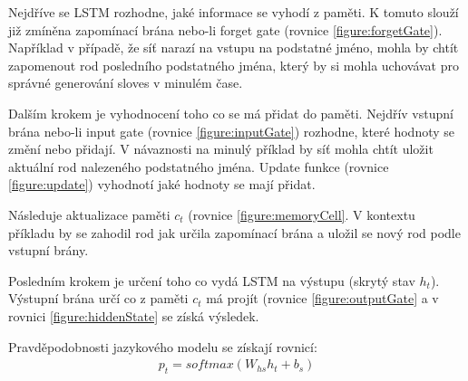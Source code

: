 Nejdříve se LSTM rozhodne, jaké informace se vyhodí z paměti. K tomuto slouží již zmíněna zapomínací brána nebo-li forget gate (rovnice \ref{figure:forgetGate}). Například v případě, že síť narazí na vstupu na podstatné jméno, mohla by chtít zapomenout rod posledního podstatného jména, který by si mohla uchovávat pro správné generování sloves v minulém čase.

Dalším krokem je vyhodnocení toho co se má přidat do paměti. Nejdřív vstupní brána nebo-li input gate (rovnice \ref{figure:inputGate}) rozhodne, které hodnoty se změní nebo přidají. V návaznosti na minulý příklad by síť mohla chtít uložit aktuální rod nalezeného podstatného jména. Update funkce (rovnice \ref{figure:update}) vyhodnotí jaké hodnoty se mají přidat. 

Následuje aktualizace paměti $c_t$ (rovnice \ref{figure:memoryCell}. V kontextu příkladu by se zahodil rod jak určila zapomínací brána a uložil se nový rod podle vstupní brány.

Posledním krokem je určení toho co vydá LSTM na výstupu (skrytý stav $h_t$). Výstupní brána určí co z paměti $c_t$ má projít (rovnice \ref{figure:outputGate} a v rovnici \ref{figure:hiddenState} se získá výsledek.

Pravděpodobnosti jazykového modelu se získají rovnicí:
\begin{align}
    p_t = softmax(W_{hs}h_{t} + b_{s})
\end{align}


\begin{figure}
    \begin{center}
    \end{center}
	\caption{}
	\label{img:LSTM}
\end{figure}



